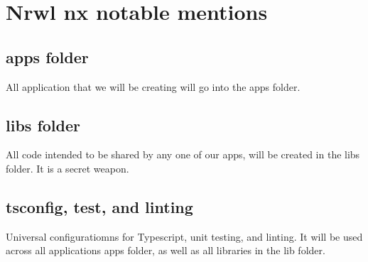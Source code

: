 \section{Nrwl nx notable mentions}

\subsection{apps folder}
All application that we will be creating will go into the apps folder.

\subsection{libs folder}
All code intended to be shared by any one of our apps, will be created in the
libs folder. It is a secret weapon.

\subsection{tsconfig, test, and linting}
Universal configuratiomns for Typescript, unit testing, and linting. It will
be used across all applications apps folder, as well as all libraries in the lib
folder.
